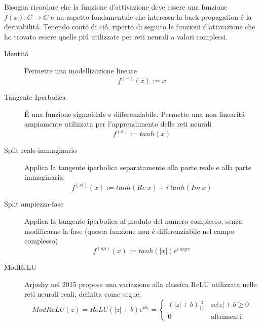\documentclass[a4paper,10pt]{article}
\begin{document}
 Bisogna ricordare che la funzione d'attivazione deve essere una funzione $f(x):C \to C$ e un aspetto fondamentale che interessa la back-propagation \'e la derivabilit\'a. Tenendo conto di ci\'o, riporto di seguito le funzioni d'attivazione che ho trovato essere quelle pi\'u utilizzate per reti neurali a valori complessi.
 \begin{description}
 \item[Identit\'a]
 Permette una modellizazione lineare
 \begin{equation}
  f^{\left(-\right) }\left(x\right) := x
 \end{equation}

 \item[Tangente Iperbolica]
 \'E una funzione sigmoidale e differenziabile. Permette una non linearit\'a ampiamente utilizzata per l'apprendimento delle reti neurali
 \begin{equation}
  f^{\left(\sigma\right) } := tanh\left( x\right)
 \end{equation}

 \item[Split reale-immaginario]
 Applica la tangente iperbolica separatamente alla parte reale e alla parte immaginaria:
 \begin{equation}
  f^{\left( ri\right)} \left( x\right) := tanh\left( Re \ x\right) +i \ tanh\left( Im \ x\right)
 \end{equation}

 \item[Split ampiezza-fase]
 Applica la tangente iperbolica al modulo del numero complesso, senza modificarne la fase (questa funzione non \'e differenziabile nel campo complesso)
 \begin{equation}
  f^{\left( ap\right) } \left( x\right) := tanh\left( \left| x\right|\right) e^{i \, arg \, x}
 \end{equation}
 
 \item[ModReLU]
 Arjosky nel 2015 propose una variazione alla classica ReLU utilizzata nelle reti neurali reali, definita come segue:
 \begin{equation}
  ModReLU\left( z\right) = ReLU\left( \left| z\right|+b\right) e^{i\theta_z} = \begin{cases}
                                                                                               \left(\left| z\right| +b\right) \frac{z}{\left| z\right|} & \mbox{se} \left| z\right| +b \ge 0 \\
                                                                                0 & \mbox{altrimenti}
                                                                

\end{cases}
\end{equation}
\end{description}
\end{document}
